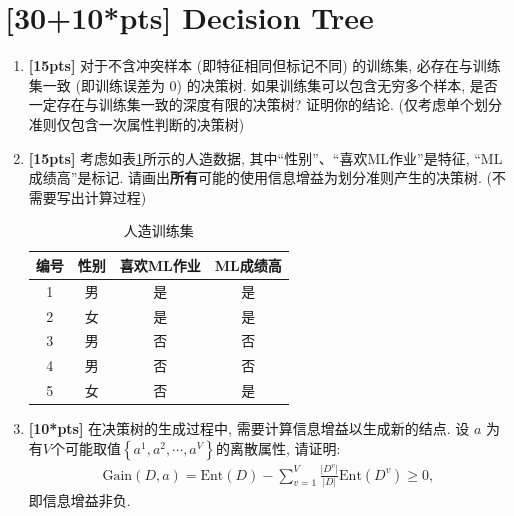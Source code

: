 \documentclass[a4paper,UTF8]{article}
\theoremstyle{definition}
\begin{document}
\section{[30+10*pts] Decision Tree}

\begin{enumerate}[(1)]
	\item \textbf{[15pts]} 对于不含冲突样本 (即特征相同但标记不同) 的训练集, 必存在与训练集一致 (即训练误差为 0) 的决策树. 如果训练集可以包含无穷多个样本, 是否一定存在与训练集一致的深度有限的决策树? 证明你的结论. (仅考虑单个划分准则仅包含一次属性判断的决策树)
	\item \textbf{[15pts]} 考虑如表\ref{data}所示的人造数据, 其中“性别”、“喜欢ML作业”是特征, “ML成绩高”是标记. 请画出\textbf{所有}可能的使用信息增益为划分准则产生的决策树. (不需要写出计算过程)
	      \begin{table}[h]
		      \caption{人造训练集}
		      \label{data}
		      \centering
		      \begin{tabular}{cccc}
			      \hline
			      编号 & 性别 & 喜欢ML作业 & ML成绩高 \\
			      \hline
			      1    & 男   & 是         & 是       \\
			      2    & 女   & 是         & 是       \\
			      3    & 男   & 否         & 否       \\
			      4    & 男   & 否         & 否       \\
			      5    & 女   & 否         & 是       \\
			      \hline
		      \end{tabular}
	      \end{table}
	\item \textbf{[10*pts]} 在决策树的生成过程中, 需要计算信息增益以生成新的结点. 设 $a$ 为有$V$个可能取值$\left\{a^1,a^2,\cdots,a^V\right\}$的离散属性, 请证明:
	      \begin{align}
		      \text{Gain}(D,a)=\text{Ent}(D)-\sum_{v=1}^V\frac{\lvert D^v\rvert}{\lvert D\rvert}\text{Ent}(D^v)\ge 0,
	      \end{align}
	      即信息增益非负.
\end{enumerate}
\end{document}
